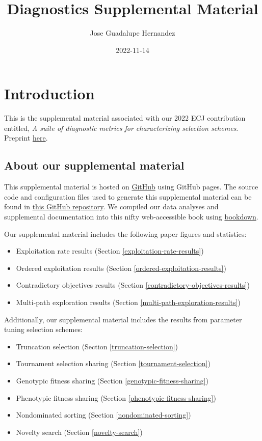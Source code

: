 \documentclass[]{book}
\title{Diagnostics Supplemental Material}
\author{Jose Guadalupe Hernandez}
\date{2022-11-14}
\providecommand{\tightlist}{%
  \setlength{\itemsep}{0pt}\setlength{\parskip}{0pt}}
\begin{document}
\maketitle

{
\setcounter{tocdepth}{1}
\tableofcontents
}
\hypertarget{introduction}{%
\chapter{Introduction}\label{introduction}}

This is the supplemental material associated with our 2022 ECJ contribution entitled, \emph{A suite of diagnostic metrics for characterizing selection schemes}.
Preprint \href{https://arxiv.org/pdf/2204.13839.pdf}{here}.

\hypertarget{about-our-supplemental-material}{%
\section{About our supplemental material}\label{about-our-supplemental-material}}

This supplemental material is hosted on \href{https://github.com}{GitHub} using GitHub pages.
The source code and configuration files used to generate this supplemental material can be found in \href{https://github.com/jgh9094/ECJ-2022-suite-of-diagnostics-for-selection-schemes}{this GitHub repository}.
We compiled our data analyses and supplemental documentation into this nifty web-accessible book using \href{https://bookdown.org/}{bookdown}.

Our supplemental material includes the following paper figures and statistics:

\begin{itemize}
\tightlist
\item
  Exploitation rate results (Section \ref{exploitation-rate-results})
\item
  Ordered exploitation results (Section \ref{ordered-exploitation-results})
\item
  Contradictory objectives results (Section \ref{contradictory-objectives-results})
\item
  Multi-path exploration results (Section \ref{multi-path-exploration-results})
\end{itemize}

Additionally, our supplemental material includes the results from parameter tuning selection schemes:

\begin{itemize}
\tightlist
\item
  Truncation selection (Section \ref{truncation-selection})
\item
  Tournament selection sharing (Section \ref{tournament-selection})
\item
  Genotypic fitness sharing (Section \ref{genotypic-fitness-sharing})
\item
  Phenotypic fitness sharing (Section \ref{phenotypic-fitness-sharing})
\item
  Nondominated sorting (Section \ref{nondominated-sorting})
\item
  Novelty search (Section \ref{novelty-search})
\end{itemize}
\end{document}
